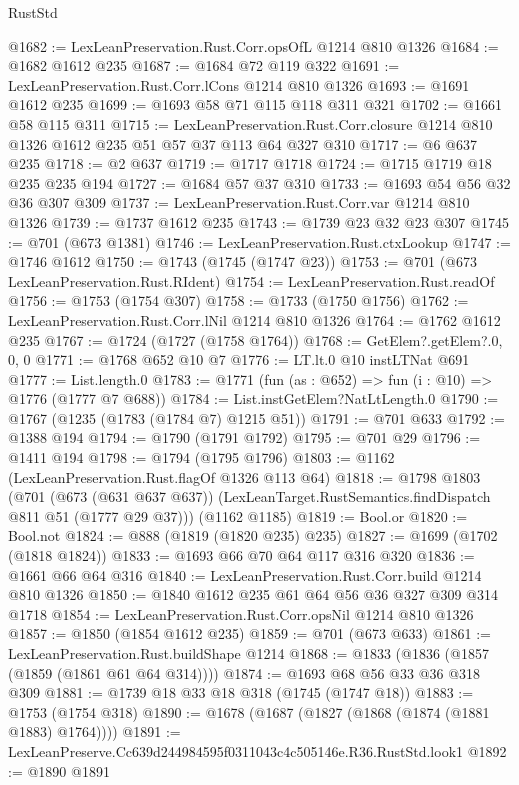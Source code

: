 \begin{lexlean}{RustStd}
\begin{coremodule}
@1682 := LexLeanPreservation.Rust.Corr.opsOfL @1214 @810 @1326
@1684 := @1682 @1612 @235
@1687 := @1684 @72 @119 @322
@1691 := LexLeanPreservation.Rust.Corr.lCons @1214 @810 @1326
@1693 := @1691 @1612 @235
@1699 := @1693 @58 @71 @115 @118 @311 @321
@1702 := @1661 @58 @115 @311
@1715 := LexLeanPreservation.Rust.Corr.closure
    @1214
    @810
    @1326
    @1612
    @235
    @51
    @57
    @37
    @113
    @64
    @327
    @310
@1717 := @6 @637 @235
@1718 := @2 @637
@1719 := @1717 @1718
@1724 := @1715 @1719 @18 @235 @235 @194
@1727 := @1684 @57 @37 @310
@1733 := @1693 @54 @56 @32 @36 @307 @309
@1737 := LexLeanPreservation.Rust.Corr.var @1214 @810 @1326
@1739 := @1737 @1612 @235
@1743 := @1739 @23 @32 @23 @307
@1745 := @701 (@673 @1381)
@1746 := LexLeanPreservation.Rust.ctxLookup
@1747 := @1746 @1612
@1750 := @1743 (@1745 (@1747 @23))
@1753 := @701 (@673 LexLeanPreservation.Rust.RIdent)
@1754 := LexLeanPreservation.Rust.readOf
@1756 := @1753 (@1754 @307)
@1758 := @1733 (@1750 @1756)
@1762 := LexLeanPreservation.Rust.Corr.lNil @1214 @810 @1326
@1764 := @1762 @1612 @235
@1767 := @1724 (@1727 (@1758 @1764))
@1768 := GetElem?.getElem?.{0, 0, 0}
@1771 := @1768 @652 @10 @7
@1776 := LT.lt.{0} @10 instLTNat @691
@1777 := List.length.{0}
@1783 := @1771 (fun (as : @652) => fun (i : @10) => @1776 (@1777 @7 @688))
@1784 := List.instGetElem?NatLtLength.{0}
@1790 := @1767 (@1235 (@1783 (@1784 @7) @1215 @51))
@1791 := @701 @633
@1792 := @1388 @194
@1794 := @1790 (@1791 @1792)
@1795 := @701 @29
@1796 := @1411 @194
@1798 := @1794 (@1795 @1796)
@1803 := @1162 (LexLeanPreservation.Rust.flagOf @1326 @113 @64)
@1818 := @1798
    @1803
    (@701
      (@673 (@631 @637 @637))
      (LexLeanTarget.RustSemantics.findDispatch @811 @51 (@1777 @29 @37)))
    (@1162 @1185)
@1819 := Bool.or
@1820 := Bool.not
@1824 := @888 (@1819 (@1820 @235) @235)
@1827 := @1699 (@1702 (@1818 @1824))
@1833 := @1693 @66 @70 @64 @117 @316 @320
@1836 := @1661 @66 @64 @316
@1840 := LexLeanPreservation.Rust.Corr.build @1214 @810 @1326
@1850 := @1840 @1612 @235 @61 @64 @56 @36 @327 @309 @314 @1718
@1854 := LexLeanPreservation.Rust.Corr.opsNil @1214 @810 @1326
@1857 := @1850 (@1854 @1612 @235)
@1859 := @701 (@673 @633)
@1861 := LexLeanPreservation.Rust.buildShape @1214
@1868 := @1833 (@1836 (@1857 (@1859 (@1861 @61 @64 @314))))
@1874 := @1693 @68 @56 @33 @36 @318 @309
@1881 := @1739 @18 @33 @18 @318 (@1745 (@1747 @18))
@1883 := @1753 (@1754 @318)
@1890 := @1678 (@1687 (@1827 (@1868 (@1874 (@1881 @1883) @1764))))
@1891 := LexLeanPreserve.Cc639d244984595f0311043c4c505146e.R36.RustStd.look1
@1892 := @1890 @1891

\end{coremodule}
\end{lexlean}
